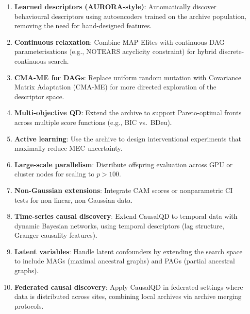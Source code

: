 \documentclass[11pt,a4paper]{article}
\begin{document}
\begin{enumerate}[leftmargin=*]
    \item \textbf{Learned descriptors (AURORA-style)}: Automatically discover behavioural descriptors using autoencoders trained on the archive population, removing the need for hand-designed features.
    
    \item \textbf{Continuous relaxation}: Combine MAP-Elites with continuous DAG parameterisations (e.g., NOTEARS acyclicity constraint) for hybrid discrete-continuous search.
    
    \item \textbf{CMA-ME for DAGs}: Replace uniform random mutation with Covariance Matrix Adaptation (CMA-ME) for more directed exploration of the descriptor space.
    
    \item \textbf{Multi-objective QD}: Extend the archive to support Pareto-optimal fronts across multiple score functions (e.g., BIC vs.\ BDeu).
    
    \item \textbf{Active learning}: Use the archive to design interventional experiments that maximally reduce MEC uncertainty.
    
    \item \textbf{Large-scale parallelism}: Distribute offspring evaluation across GPU or cluster nodes for scaling to $p > 100$.
    
    \item \textbf{Non-Gaussian extensions}: Integrate CAM scores \citep{buhlmann2014cam} or nonparametric CI tests for non-linear, non-Gaussian data.
    
    \item \textbf{Time-series causal discovery}: Extend CausalQD to temporal data with dynamic Bayesian networks, using temporal descriptors (lag structure, Granger causality features).
    
    \item \textbf{Latent variables}: Handle latent confounders by extending the search space to include MAGs (maximal ancestral graphs) and PAGs (partial ancestral graphs).
    
    \item \textbf{Federated causal discovery}: Apply CausalQD in federated settings where data is distributed across sites, combining local archives via archive merging protocols.
\end{enumerate}
\end{document}
